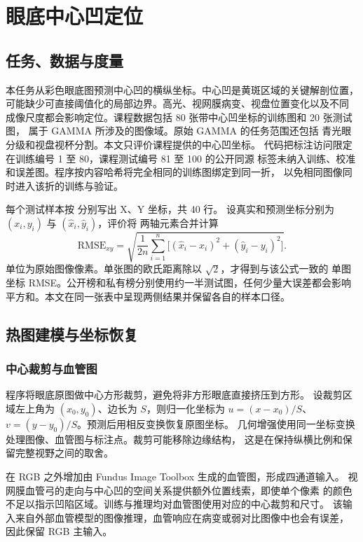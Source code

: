 \chapter{眼底中心凹定位}
\label{chap:fovea}

\section{任务、数据与度量}
本任务从彩色眼底图预测中心凹的横纵坐标。中心凹是黄斑区域的关键解剖位置，
可能缺少可直接阈值化的局部边界。高光、视网膜病变、视盘位置变化以及不同
成像尺度都会影响定位。课程数据包括 80 张带中心凹坐标的训练图和 20 张测试图，
属于 GAMMA 所涉及的图像域\citep{wu2023gamma}。原始 GAMMA 的任务范围还包括
青光眼分级和视盘视杯分割。本文只评价课程提供的中心凹坐标。
代码把标注访问限定在训练编号 1 至 80，课程测试编号 81 至 100 的公开同源
标签未纳入训练、校准和误差图。程序按内容哈希将完全相同的训练图绑定到同一折，
以免相同图像同时进入该折的训练与验证。

每个测试样本按  分别写出 X、Y 坐标，共 40 行。
设真实和预测坐标分别为 $(x_i,y_i)$ 与 $(\hat x_i,\hat y_i)$，评价将
两轴元素合并计算
\begin{equation}
 \mathrm{RMSE}_{xy}
 =\sqrt{\frac{1}{2n}\sum_{i=1}^n
         \big[(\hat x_i-x_i)^2+(\hat y_i-y_i)^2\big]} .
 \label{eq:fovea-rmse}
\end{equation}
单位为原始图像像素。单张图的欧氏距离除以 $\sqrt 2$，才得到与该公式一致的
单图坐标 RMSE。公开榜和私有榜分别使用约一半测试图，任何少量大误差都会影响
平方和。本文在同一张表中呈现两侧结果并保留各自的样本口径。

\section{热图建模与坐标恢复}
\subsection{中心裁剪与血管图}
程序将眼底原图做中心方形裁剪，避免将非方形眼底直接挤压到方形。
设裁剪区域左上角为 $(x_0,y_0)$、边长为 $S$，则归一化坐标为
$u=(x-x_0)/S$、$v=(y-y_0)/S$。预测后用相反变换恢复原图坐标。
几何增强使用同一坐标变换处理图像、血管图与标注点。裁剪可能移除边缘结构，
这是在保持纵横比例和保留完整视野之间的取舍。

在 RGB 之外增加由 Fundus Image Toolbox 生成的血管图，形成四通道输入。
视网膜血管弓的走向与中心凹的空间关系提供额外位置线索，即使单个像素
的颜色不足以指示凹陷区域。训练与推理均对血管图使用对应的中心裁剪和尺寸。
该输入来自外部血管模型的图像推理，血管响应在病变或弱对比图像中也会有误差，
因此保留 RGB 主输入。

